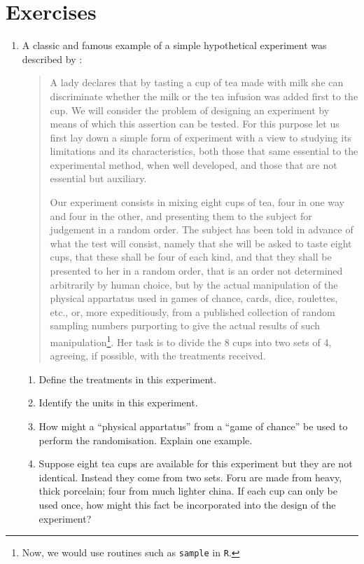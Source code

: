 \documentclass[
]{book}
\providecommand{\tightlist}{%
  \setlength{\itemsep}{0pt}\setlength{\parskip}{0pt}}
\theoremstyle{definition}
\theoremstyle{definition}
\theoremstyle{definition}
\theoremstyle{definition}
\theoremstyle{remark}
\begin{document}
\hypertarget{exercises}{%
\section{Exercises}\label{exercises}}

\begin{enumerate}
\def\labelenumi{\arabic{enumi}.}
\item
  \citep[Adapted from][]{Morris2011} A classic and famous example of a simple hypothetical experiment was described by \citet{Fisher1935}:

  \begin{quote}
  A lady declares that by tasting a cup of tea made with milk she can discriminate whether the milk or the tea infusion was added first to the cup. We will consider the problem of designing an experiment by means of which this assertion can be tested. For this purpose let us first lay down a simple form of experiment with a view to studying its limitations and its characteristics, both those that same essential to the experimental method, when well developed, and those that are not essential but auxiliary.

  Our experiment consists in mixing eight cups of tea, four in one way and four in the other, and presenting them to the subject for judgement in a random order. The subject has been told in advance of what the test will consist, namely that she will be asked to taste eight cups, that these shall be four of each kind, and that they shall be presented to her in a random order, that is an order not determined arbitrarily by human choice, but by the actual manipulation of the physical appartatus used in games of chance, cards, dice, roulettes, etc., or, more expeditiously, from a published collection of random sampling numbers purporting to give the actual results of such manipulation\footnote{Now, we would use routines such as \texttt{sample} in \texttt{R}.}. Her task is to divide the 8 cups into two sets of 4, agreeing, if possible, with the treatments received.
  \end{quote}

  \begin{enumerate}
  \def\labelenumii{\alph{enumii}.}
  \tightlist
  \item
    Define the treatments in this experiment.
  \item
    Identify the units in this experiment.
  \item
    How might a ``physical appartatus'' from a ``game of chance'' be used to perform the randomisation. Explain one example.
  \item
    Suppose eight tea cups are available for this experiment but they are not identical. Instead they come from two sets. Foru are made from heavy, thick porcelain; four from much lighter china. If each cup can only be used once, how might this fact be incorporated into the design of the experiment?
  \end{enumerate}
\end{enumerate}
\end{document}
